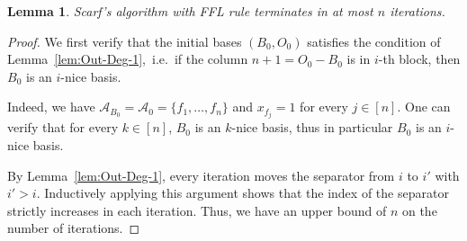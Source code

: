 \documentclass[11pt]{article}
\newtheorem{lemma}[theorem]{Lemma}
\begin{document}
        

























\begin{lemma}\label{lem:Scarf-Linear-Time}
    Scarf's algorithm with FFL rule terminates in at most $n$ iterations.
\end{lemma}

\begin{proof}
We first verify that the initial bases $(B_0,O_0)$ satisfies the condition of Lemma~\ref{lem:Out-Deg-1},~i.e.~if the column $n+1=O_0-B_0$ is in $i$-th block, then $B_0$ is an $i$-nice basis.

Indeed, we have $\mathcal{A}_{B_0}=\mathcal{A}_0=\{f_1,\dots,f_n\}$ and $x_{f_j}=1$ for every $j\in[n]$. One can verify that for every $k\in[n]$, $B_0$ is an $k$-nice basis, thus in particular $B_0$ is an $i$-nice basis.
    
By Lemma~\ref{lem:Out-Deg-1}, every iteration moves the separator from $i$ to $i'$ with $i'>i$. Inductively applying this argument shows that the index of the separator strictly increases in each iteration. Thus, we have an upper bound of $n$ on the number of iterations.
\end{proof}
\end{document}
